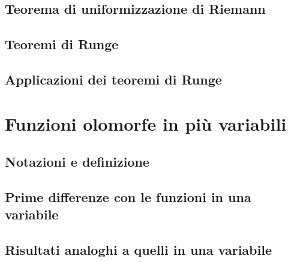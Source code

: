 \documentclass{article}
\begin{document}
\subsection{Teorema di uniformizzazione di Riemann}


\subsection{Teoremi di Runge}


\subsection{Applicazioni dei teoremi di Runge}


\newpage

\section{Funzioni olomorfe in più variabili}

\subsection{Notazioni e definizione}


\subsection{Prime differenze con le funzioni in una variabile}


\subsection{Risultati analoghi a quelli in una variabile}

\end{document}
